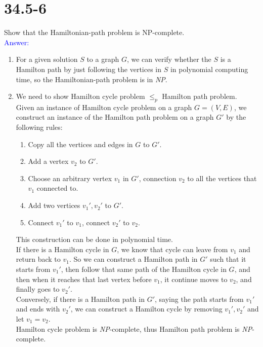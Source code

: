 \documentclass[a4paper]{article}
\begin{document}
\section{34.5-6}
Show that the Hamiltonian-path problem is NP-complete.\\
\textcolor{blue}{Answer:}
\begin{enumerate}
    \item For a given solution $S$ to a graph $G$, we can verify whether the $S$ is a Hamilton path by just following the vertices in $S$ in polynomial computing time, so the Hamiltonian-path problem is in \textit{NP}.
    \item We need to show Hamilton cycle problem $\leq_p$ Hamilton path problem.\\
    Given an instance of Hamilton cycle problem on a graph $G=(V,E)$, we construct an instance of the Hamilton path problem on a graph $G'$ by the following rules:
    \begin{enumerate}
        \item Copy all the vertices and edges in $G$ to $G'$.
        \item Add a vertex $v_2$ to $G'$.
        \item Choose an arbitrary vertex $v_1$ in $G'$, connection $v_2$ to all the vertices that $v_1$ connected to.
        \item Add two vertices $v_1',v_2'$ to $G'$.
        \item Connect $v_1'$ to $v_1$, connect $v_2'$ to $v_2$.
    \end{enumerate}
    This construction can be done in polynomial time.\\
    If there is a Hamilton cycle in $G$, we know that cycle can leave from $v_1$ and return back to $v_1$. So we can construct a Hamilton path in $G'$ such that it starts from $v_1'$, then follow that same path of the Hamilton cycle in $G$, and then when it reaches that last vertex before $v_1$, it continue moves to $v_2$, and finally goes to $v_2'$.\\
    Conversely, if there is a Hamilton path in $G'$, saying the path starts from $v_1'$ and ends with $v_2'$, we can construct a Hamilton cycle by removing $v_1',v_2'$ and let $v_1=v_2$.\\
    Hamilton cycle problem is \textit{NP}-complete, thus Hamilton path problem is \textit{NP}-complete.
\end{enumerate}
\end{document}
